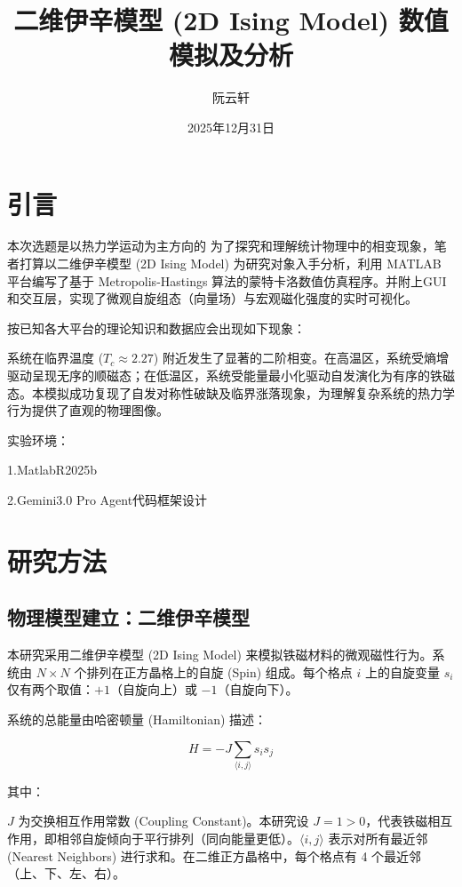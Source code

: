 \documentclass[supercite]{Experimental_Report}
\title{二维伊辛模型 (2D Ising Model) 数值模拟及分析}
\author{阮云轩}
\date{2025年12月31日}
\theoremstyle{definition}
\begin{document}
	
	\maketitle
	
	\clearpage
	
	
	\tableofcontents[level=2]
	
	\clearpage
	
	
	\listoflistings
	
	\section{引言}
	本次选题是以热力学运动为主方向的
	为了探究和理解统计物理中的相变现象，笔者打算以二维伊辛模型 (2D Ising Model) 为研究对象入手分析，利用 MATLAB 平台编写了基于 Metropolis-Hastings 算法的蒙特卡洛数值仿真程序。并附上GUI和交互层，实现了微观自旋组态（向量场）与宏观磁化强度的实时可视化。
	
	按已知各大平台的理论知识和数据应会出现如下现象：
	
	系统在临界温度 ($T_c \approx 2.27$) 附近发生了显著的二阶相变。在高温区，系统受熵增驱动呈现无序的顺磁态；在低温区，系统受能量最小化驱动自发演化为有序的铁磁态。本模拟成功复现了自发对称性破缺及临界涨落现象，为理解复杂系统的热力学行为提供了直观的物理图像。
	
	实验环境：
	
	1.MatlabR2025b
	
	2.Gemini3.0 Pro Agent代码框架设计
	
	
	
	\section{研究方法}
	\subsection{物理模型建立：二维伊辛模型}
	本研究采用二维伊辛模型 (2D Ising Model) 来模拟铁磁材料的微观磁性行为。系统由 $N \times N$ 个排列在正方晶格上的自旋 (Spin) 组成。每个格点 $i$ 上的自旋变量 $s_i$ 仅有两个取值：$+1$（自旋向上）或 $-1$（自旋向下）。
	
	系统的总能量由哈密顿量 (Hamiltonian) 描述：
	
	$$H = -J \sum_{\langle i, j \rangle} s_i s_j$$
	
	其中：
	
	$J$ 为交换相互作用常数 (Coupling Constant)。本研究设 $J=1 > 0$，代表铁磁相互作用，即相邻自旋倾向于平行排列（同向能量更低）。$\langle i, j \rangle$ 表示对所有最近邻 (Nearest Neighbors) 进行求和。在二维正方晶格中，每个格点有 4 个最近邻（上、下、左、右）。
	
\end{document}
